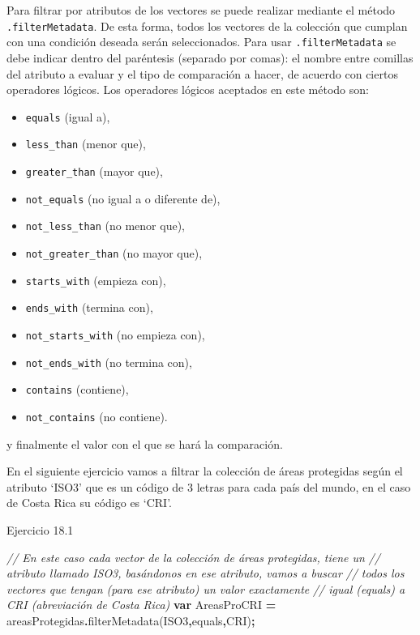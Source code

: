 \documentclass[
  12pt,
  letterpaper,
  twoside]{book}
\newenvironment{Shaded}{\begin{snugshade}}{\end{snugshade}}
\newcommand{\CommentTok}[1]{\textcolor[rgb]{0.56,0.35,0.01}{\textit{#1}}}
\newcommand{\FunctionTok}[1]{\textcolor[rgb]{0.00,0.00,0.00}{#1}}
\newcommand{\KeywordTok}[1]{\textcolor[rgb]{0.13,0.29,0.53}{\textbf{#1}}}
\newcommand{\NormalTok}[1]{#1}
\newcommand{\OperatorTok}[1]{\textcolor[rgb]{0.81,0.36,0.00}{\textbf{#1}}}
\newcommand{\StringTok}[1]{\textcolor[rgb]{0.31,0.60,0.02}{#1}}
\providecommand{\tightlist}{%
  \setlength{\itemsep}{0pt}\setlength{\parskip}{0pt}}
\begin{document}
Para filtrar por atributos de los vectores se puede realizar mediante el método \texttt{.filterMetadata}. De esta forma, todos los vectores de la colección que cumplan con una condición deseada serán seleccionados. Para usar \texttt{.filterMetadata} se debe indicar dentro del paréntesis (separado por comas): el nombre entre comillas del atributo a evaluar y el tipo de comparación a hacer, de acuerdo con ciertos operadores lógicos. Los operadores lógicos aceptados en este método son:

\begin{itemize}
\tightlist
\item
  \texttt{equals} (igual a),
\item
  \texttt{less\_than} (menor que),
\item
  \texttt{greater\_than} (mayor que),
\item
  \texttt{not\_equals} (no igual a o diferente de),
\item
  \texttt{not\_less\_than} (no menor que),
\item
  \texttt{not\_greater\_than} (no mayor que),
\item
  \texttt{starts\_with} (empieza con),
\item
  \texttt{ends\_with} (termina con),
\item
  \texttt{not\_starts\_with} (no empieza con),
\item
  \texttt{not\_ends\_with} (no termina con),
\item
  \texttt{contains} (contiene),
\item
  \texttt{not\_contains} (no contiene).
\end{itemize}

y finalmente el valor con el que se hará la comparación.

En el siguiente ejercicio vamos a filtrar la colección de áreas protegidas según el atributo `ISO3' que es un código de 3 letras para cada país del mundo, en el caso de Costa Rica su código es `CRI'.

Ejercicio 18.1

\begin{Shaded}
\begin{Highlighting}[]
\CommentTok{// En este caso cada vector de la colección de áreas protegidas, tiene un }
\CommentTok{// atributo llamado \textquotesingle{}ISO3\textquotesingle{}, basándonos en ese atributo, vamos a buscar }
\CommentTok{// todos los vectores que tengan (para ese atributo) un valor exactamente }
\CommentTok{// igual (\textquotesingle{}equals\textquotesingle{}) a \textquotesingle{}CRI\textquotesingle{} (abreviación de Costa Rica)}
\KeywordTok{var}\NormalTok{ AreasProCRI }\OperatorTok{=}\NormalTok{ areasProtegidas}\OperatorTok{.}\FunctionTok{filterMetadata}\NormalTok{(}\StringTok{\textquotesingle{}ISO3\textquotesingle{}}\OperatorTok{,}\StringTok{\textquotesingle{}equals\textquotesingle{}}\OperatorTok{,}\StringTok{\textquotesingle{}CRI\textquotesingle{}}\NormalTok{)}\OperatorTok{;} 
\end{Highlighting}
\end{Shaded}
\end{document}
